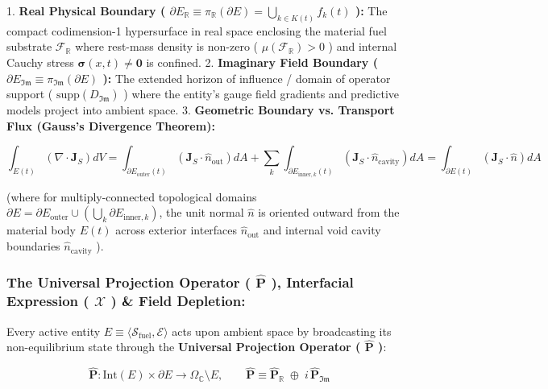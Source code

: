 \documentclass[11pt,a4paper]{article}
\theoremstyle{definition}
\theoremstyle{remark}
\begin{document}
1. \textbf{Real Physical Boundary ( $\partial E_{\mathbb{R}} \equiv \pi_{\mathbb{R}}(\partial E) = \bigcup_{k \in K(t)} f_k(t)$ ):}
The compact codimension-1 hypersurface in real space enclosing the material fuel substrate $\mathcal{F}_{\mathbb{R}}$ where rest-mass density is non-zero ( $\mu(\mathcal{F}_{\mathbb{R}}) > 0$ ) and internal Cauchy stress $\boldsymbol{\sigma}(x, t) \neq \mathbf{0}$ is confined.
2. \textbf{Imaginary Field Boundary ( $\partial E_{\mathfrak{Im}} \equiv \pi_{\mathfrak{Im}}(\partial E)$ ):}
The extended horizon of influence / domain of operator support ( $\text{supp}(D_{\mathfrak{Im}})$ ) where the entity's gauge field gradients and predictive models project into ambient space.
3. \textbf{Geometric Boundary vs. Transport Flux (Gauss's Divergence Theorem):}


\begin{equation}
\boxed{\int_{E(t)} \left( \nabla \cdot \mathbf{J}_S \right) dV = \int_{\partial E_{\text{outer}}(t)} \left( \mathbf{J}_S \cdot \hat{n}_{\text{out}} \right) dA + \sum_k \int_{\partial E_{\text{inner}, k}(t)} \left( \mathbf{J}_S \cdot \hat{n}_{\text{cavity}} \right) dA = \int_{\partial E(t)} \left( \mathbf{J}_S \cdot \hat{n} \right) dA}
\end{equation}


(where for multiply-connected topological domains $\partial E = \partial E_{\text{outer}} \cup (\bigcup_k \partial E_{\text{inner}, k})$, the unit normal $\hat{n}$ is oriented outward from the material body $E(t)$ across exterior interfaces $\hat{n}_{\text{out}}$ and internal void cavity boundaries $\hat{n}_{\text{cavity}}$ ).

\subsubsection{The Universal Projection Operator ( $\hat{\mathbf{P}}$ ), Interfacial Expression ( $\boldsymbol{\mathcal{X}}$ ) \& Field Depletion:}
Every active entity $E \equiv \langle \mathcal{S}_{\text{fuel}}, \mathcal{E} \rangle$ acts upon ambient space by broadcasting its non-equilibrium state through the \textbf{Universal Projection Operator ( $\hat{\mathbf{P}}$ )}:


\begin{equation}
\boxed{\hat{\mathbf{P}}: \mathrm{Int}(E) \times \partial E \longrightarrow \Omega_{\mathbb{C}} \setminus E, \qquad \hat{\mathbf{P}} \equiv \hat{\mathbf{P}}_{\mathbb{R}} \;\oplus\; i \, \hat{\mathbf{P}}_{\mathfrak{Im}}}
\end{equation}
\end{document}
